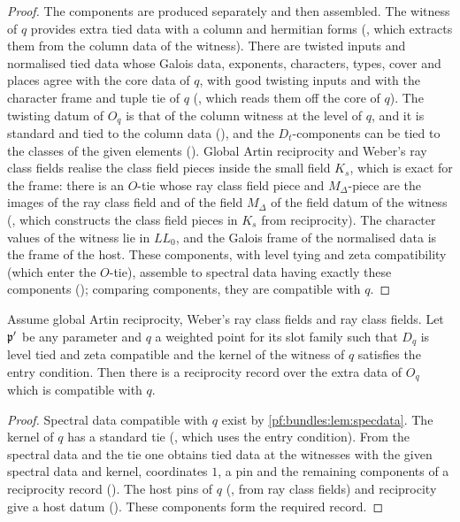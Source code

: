 \begin{proof}
The components are produced separately and then assembled. The witness of $q$ provides extra tied data with a column and hermitian forms
(, which extracts them from the column data of the witness). There are twisted inputs and
normalised tied data whose Galois data, exponents, characters, types, cover and places agree with the core data of $q$, with good twisting inputs and
with the character frame and tuple tie of $q$ (, which reads them off the core
of $q$). The twisting datum of $O_q$ is that of the column witness at the level of $q$, and it is standard and tied to the column data
(), and the $D_t$-components can be tied to the classes of the given elements
(). Global Artin reciprocity and Weber's ray class fields realise the class field pieces inside
the small field $K_s$, which is exact for the frame: there is an $O$-tie whose ray class field piece and $M_\Delta$-piece are the images of the
ray class field and of the field $M_\Delta$ of the field datum of the witness (,
which constructs the class field pieces in $K_s$ from reciprocity). The character values of the witness lie in $\mathit{LL}_0$, and the Galois
frame of the normalised data is the frame of the host. These components, with level tying and zeta compatibility (which enter the $O$-tie),
assemble to spectral data having exactly these components (); comparing components,
they are compatible with $q$.
\end{proof}

\begin{lemma}\label{pf:bundles:lem:rec}
Assume global Artin reciprocity, Weber's ray class fields and ray class fields. Let $\mathfrak p'$ be any parameter and $q$ a weighted point
for its slot family such that $D_q$ is level tied and zeta compatible and the kernel of the witness of $q$ satisfies the entry
condition. Then there is a reciprocity record over the extra data of $O_q$ which is compatible with $q$.
\end{lemma}

\begin{proof}
Spectral data compatible with $q$ exist by \cref{pf:bundles:lem:specdata}. The kernel of $q$ has a standard tie
(, which uses the entry condition). From the spectral data and the tie one obtains
tied data at the witnesses with the given spectral data and kernel, coordinates $1$, a pin and the remaining components of a
reciprocity record (). The host pins of $q$
(, from ray class fields) and reciprocity give a host datum
(). These components form the required record.
\end{proof}

